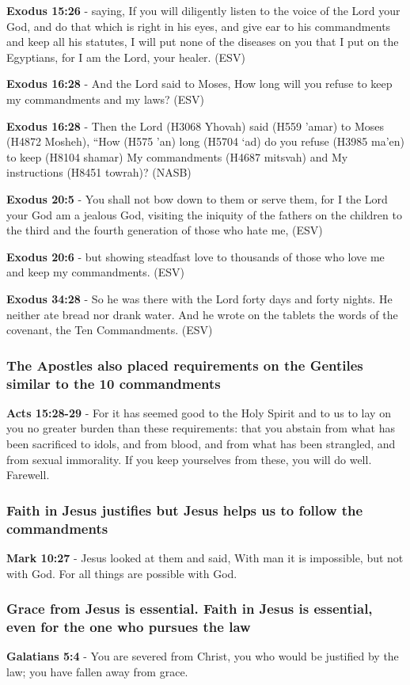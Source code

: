 \documentclass[11pt]{article}
\begin{document}
\textbf{Exodus 15:26} - saying, If you will diligently listen to the voice of the Lord your God, and do that which is right in his eyes, and give ear to his commandments and keep all his statutes, I will put none of the diseases on you that I put on the Egyptians, for I am the Lord, your healer. (ESV)

\textbf{Exodus 16:28} - And the Lord said to Moses, How long will you refuse to keep my commandments and my laws? (ESV)

\textbf{Exodus 16:28} - Then the Lord (H3068 Yhovah) said (H559 'amar) to Moses (H4872 Mosheh), “How (H575 'an) long (H5704 `ad) do you refuse (H3985 ma'en) to keep (H8104 shamar) My commandments (H4687 mitsvah) and My instructions (H8451 towrah)? (NASB)

\textbf{Exodus 20:5} - You shall not bow down to them or serve them, for I the Lord your God am a jealous God, visiting the iniquity of the fathers on the children to the third and the fourth generation of those who hate me, (ESV)

\textbf{Exodus 20:6} - but showing steadfast love to thousands of those who love me and keep my commandments. (ESV)

\textbf{Exodus 34:28} - So he was there with the Lord forty days and forty nights. He neither ate bread nor drank water. And he wrote on the tablets the words of the covenant, the Ten Commandments. (ESV)

\subsubsection{The Apostles also placed requirements on the Gentiles similar to the 10 commandments}
\label{sec:org71166a6}
\textbf{Acts 15:28-29} - For it has seemed good to the Holy Spirit and to us to lay on you no greater burden than these requirements: that you abstain from what has been sacrificed to idols, and from blood, and from what has been strangled, and from sexual immorality. If you keep yourselves from these, you will do well. Farewell.

\subsubsection{Faith in Jesus justifies but Jesus helps us to follow the commandments}
\label{sec:org78fbda8}
\textbf{Mark 10:27} - Jesus looked at them and said, With man it is impossible, but not with God. For all things are possible with God.

\subsubsection{Grace from Jesus is essential. Faith in Jesus is essential, even for the one who pursues the law}
\label{sec:org6b55cc0}
\textbf{Galatians 5:4} - You are severed from Christ, you who would be justified by the law; you have fallen away from grace.
\end{document}
